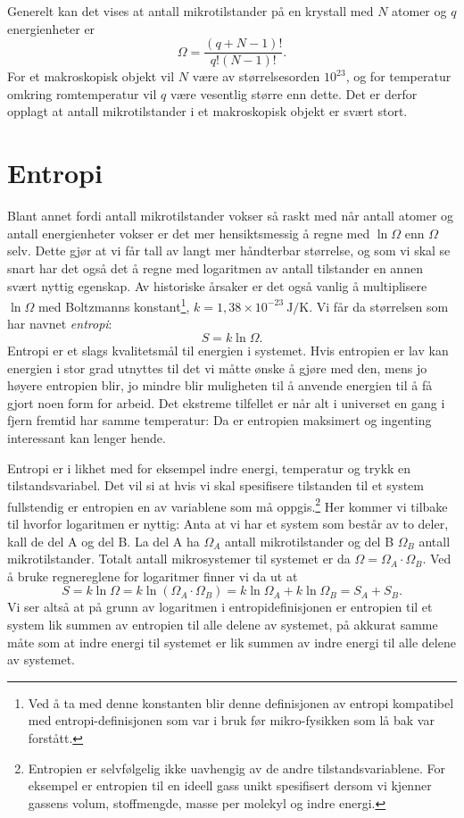 Generelt kan det vises at antall mikrotilstander på en krystall med $N$ atomer og $q$ energienheter er 
\begin{displaymath}
	\Omega = \frac{(q+N-1)!}{q!(N-1)!}.
\end{displaymath}
For et makroskopisk objekt vil $N$ være av størrelsesorden $10^{23}$, og for temperatur omkring romtemperatur vil $q$ være vesentlig større enn dette. Det er derfor opplagt at antall mikrotilstander i et makroskopisk objekt er svært stort. 

\section{Entropi}
\label{sec:t2:entropi}
Blant annet fordi antall mikrotilstander vokser så raskt med når antall atomer og antall energienheter vokser er det mer hensiktsmessig å regne med $\ln\Omega$ enn $\Omega$ selv. Dette gjør at vi får tall av langt mer håndterbar størrelse, og som vi skal se snart har det også det å regne med logaritmen av antall tilstander en annen svært nyttig egenskap. Av historiske årsaker er det også vanlig å multiplisere $\ln\Omega$ med Boltzmanns konstant\footnote{Ved å ta med denne konstanten blir denne definisjonen av entropi kompatibel med entropi-definisjonen som var i bruk før mikro-fysikken som lå bak var forstått.}, $k=1,38\times10^{-23}~\mathrm{J/K}$. Vi får da størrelsen som har navnet \emph{entropi}:
\begin{displaymath}
	S = k\ln\Omega.
\end{displaymath}
Entropi er et slags kvalitetsmål til energien i systemet. Hvis entropien er lav kan energien i stor grad utnyttes til det vi måtte ønske å gjøre med den, mens jo høyere entropien blir, jo mindre blir muligheten til å anvende energien til å få gjort noen form for arbeid. Det ekstreme tilfellet er når alt i universet en gang i fjern fremtid har samme temperatur: Da er entropien maksimert og ingenting interessant kan lenger hende.

Entropi er i likhet med for eksempel indre energi, temperatur og trykk en tilstandsvariabel. Det vil si at hvis vi skal spesifisere tilstanden til et system fullstendig er entropien en av variablene som må oppgis.\footnote{Entropien er selvfølgelig ikke uavhengig av de andre tilstandsvariablene. For eksempel er entropien til en ideell gass unikt spesifisert dersom vi kjenner gassens volum, stoffmengde, masse per molekyl og indre energi.} Her kommer vi tilbake til hvorfor logaritmen er nyttig: Anta at vi har et system som består av to deler, kall de del A og del B. La del A ha $\Omega_A$ antall mikrotilstander og del B $\Omega_B$ antall mikrotilstander. Totalt antall mikrosystemer til systemet er da $\Omega = \Omega_A\cdot\Omega_B$. Ved å bruke regnereglene for logaritmer finner vi da ut at 
\begin{displaymath}
	S = k\ln\Omega = k\ln(\Omega_A\cdot\Omega_B) = k\ln\Omega_A + k\ln\Omega_B = S_A + S_B.
\end{displaymath}
Vi ser altså at på grunn av logaritmen i entropidefinisjonen er entropien til et system lik summen av entropien til alle delene av systemet, på akkurat samme måte som at indre energi til systemet er lik summen av indre energi til alle delene av systemet. 

